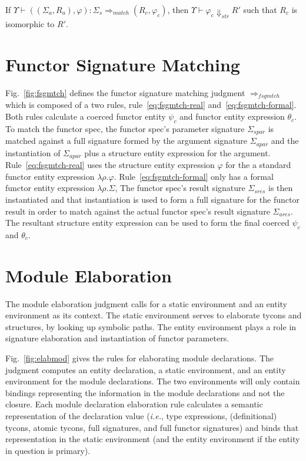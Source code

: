 \documentclass[9pt,nocopyrightspace, fleqn]{sigplanconf}
\begin{document}
\begin{lemma}
If $\Upsilon \vdash ((\Sigma_a,R_a),\varphi) : \Sigma_s
\Rightarrow_{match} (R_c,\varphi_c)$, then $\Upsilon\vdash \varphi_c
\Downarrow_{str} R'$ such that $R_c$ is isomorphic to $R'$. 
\end{lemma}

\section{Functor Signature Matching}
Fig.~\ref{fig:fsgmtch} defines the functor signature matching judgment
$\Rightarrow_{fsgmtch}$ which is composed of a two rules,
rule~\ref{eq:fsgmtch-real} and~\ref{eq:fsgmtch-formal}. Both rules calculate a coerced functor entity
$\psi_c$ and functor entity expression $\theta_c$. To match the
functor spec, the functor spec's parameter signature $\Sigma_{spar}$
is matched against a full signature formed by the argument 
signature $\Sigma_{apar}$ and the instantiation of $\Sigma_{apar}$
plus a structure entity expression for the
argument. Rule~\ref{eq:fsgmtch-real} uses the structure entity
expression $\varphi$ for the a standard functor entity expression
$\lambda\rho.\varphi$. Rule~\ref{eq:fsgmtch-formal} only has a formal
functor entity expression $\lambda\rho.\Sigma$, 
The functor spec's result signature $\Sigma_{sres}$ is then
instantiated and that instantiation is used to form a full signature
for the functor result in order to match against the actual functor
spec's result signature $\Sigma_{ares}$. The resultant structure
entity expression can be used to form the final coerced $\psi_c$ and
$\theta_c$.  

\section{Module Elaboration}\label{sec:modelab}

The module elaboration judgment calls for a static environment and an
entity environment as its context. The static environment serves to
elaborate tycons and structures, by looking up symbolic paths. The
entity environment plays a role in signature elaboration and
instantiation of functor parameters.

Fig.~\ref{fig:elabmod} gives the rules for elaborating module
declarations. The judgment computes an entity declaration, a static
environment, and an entity environment for the module
declarations. The two environments will only contain bindings
representing the information in the module declarations and not the
closure. Each module declaration elaboration rule calculates a
semantic representation of the declaration value (\emph{i.e.}, type
expressions, (definitional) tycons, atomic tycons, full signatures,
and full functor signatures) and binds that representation in the
static environment (and the entity environment if the entity in
question is primary).
\end{document}

